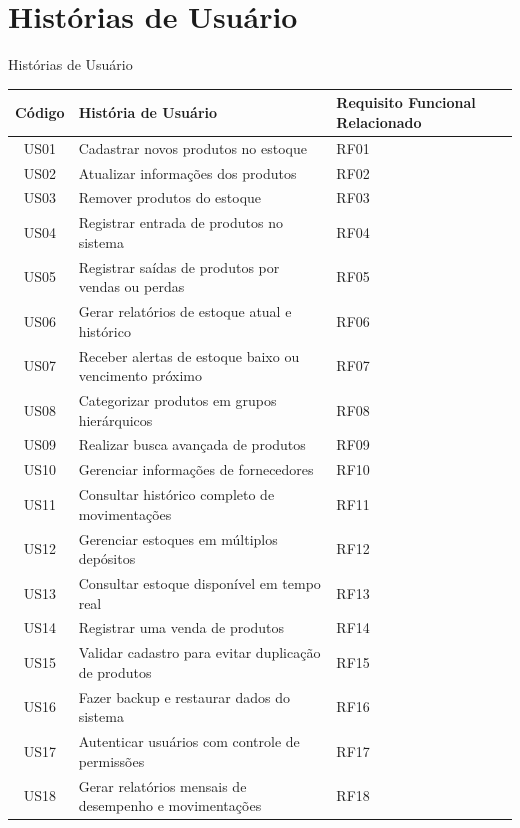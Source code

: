 \documentclass[
	12pt,				%
	openright,			%
	twoside,			%
	a4paper,			%
	english,			%
	french,				%
	spanish,			%
	brazil				%
	]{abntex2}
\begin{document}
\section{Histórias de Usuário}

\begin{quadro}[htb]
\caption{Histórias de Usuário}
\label{quadro_hist_usuarios}
\begin{tabular}{|c|p{10cm}|p{4cm}|}
\hline
\textbf{Código} & \textbf{História de Usuário} & \textbf{Requisito Funcional Relacionado} \\
\hline
US01 & Cadastrar novos produtos no estoque & RF01 \\ \hline
US02 & Atualizar informações dos produtos & RF02 \\ \hline
US03 & Remover produtos do estoque & RF03 \\ \hline
US04 & Registrar entrada de produtos no sistema & RF04 \\ \hline
US05 & Registrar saídas de produtos por vendas ou perdas & RF05 \\ \hline
US06 & Gerar relatórios de estoque atual e histórico & RF06 \\ \hline
US07 & Receber alertas de estoque baixo ou vencimento próximo & RF07 \\ \hline
US08 & Categorizar produtos em grupos hierárquicos & RF08 \\ \hline
US09 & Realizar busca avançada de produtos & RF09 \\ \hline
US10 & Gerenciar informações de fornecedores & RF10 \\ \hline
US11 & Consultar histórico completo de movimentações & RF11 \\ \hline
US12 & Gerenciar estoques em múltiplos depósitos & RF12 \\ \hline
US13 & Consultar estoque disponível em tempo real & RF13 \\ \hline
US14 & Registrar uma venda de produtos & RF14 \\ \hline
US15 & Validar cadastro para evitar duplicação de produtos & RF15 \\ \hline
US16 & Fazer backup e restaurar dados do sistema & RF16 \\ \hline
US17 & Autenticar usuários com controle de permissões & RF17 \\ \hline
US18 & Gerar relatórios mensais de desempenho e movimentações & RF18 \\
\hline
\end{tabular}
\end{quadro}
\end{document}
